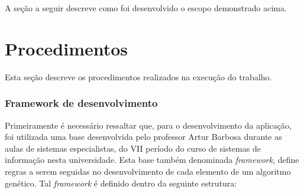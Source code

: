 \par A seção a seguir descreve como foi desenvolvido o escopo demonstrado acima.



\section{Procedimentos}

\par Esta seção descreve os procedimentos realizados na execução do trabalho.

\subsubsection{Framework de desenvolvimento}
\par Primeiramente é necessário ressaltar que, para o desenvolvimento da aplicação, foi utilizada uma base desenvolvida pelo professor Artur Barbosa durante as aulas de sistemas especialistas, do VII período do curso de sistemas de informação nesta universidade.
Esta base também denominada \textit{framework}, define regras a serem seguidas no desenvolvimento de cada elemento
de um algoritmo genético. Tal \textit{framework} é definido dentro da seguinte estrutura:

